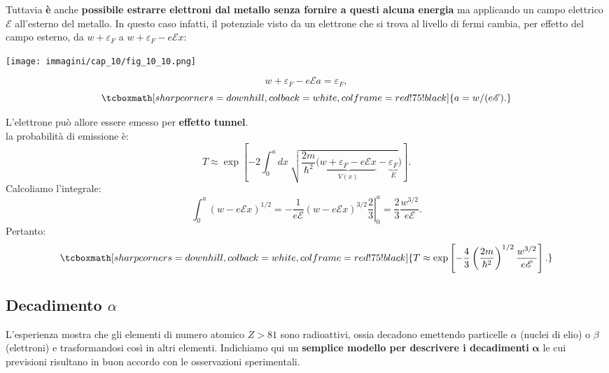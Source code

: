 \documentclass[a4paper,12pt,oneside]{book}
\begin{document}
Tuttavia \textbf{è} anche \textbf{possibile estrarre elettroni dal metallo senza fornire a questi alcuna energia} ma applicando un campo elettrico $\mathscr{E}$ all'esterno del metallo. In questo caso infatti, il potenziale visto da un elettrone che si trova al livello di fermi cambia, per effetto del campo esterno, da $w+\varepsilon _F$ a $w+\varepsilon _F-e\mathscr{E}x$:\\
\vspace{.5cm}
\begin{minipage}{.6\textwidth}
\texttt{[image: immagini/cap\_10/fig\_10\_10.png]}
\end{minipage}
\begin{minipage}{.4\textwidth}
\begin{equation}
w+\varepsilon _F-e\mathscr{E}a=\varepsilon _F ,
\end{equation}
\begin{equation}
\tcboxmath[sharp corners=downhill, colback=white, colframe=red!75!black]{
a= w/(e\mathscr{E}) .
}
\end{equation}
\end{minipage}
L'elettrone può allore essere emesso per \textbf{effetto tunnel}.\\
la probabilità di emissione è:
	\begin{equation}
		T \approx \exp \left[-2 \int_{0} ^{a} dx\ \sqrt{\frac{2m}{\hbar ^2} (\underbrace{w+\varepsilon _F-e\mathscr{E}x}_{V(x)}-\underbrace{\varepsilon _F}_{E}})\right].
	\end{equation}
Calcoliamo l'integrale:
	\begin{equation}
		\int _{0} ^{a} \left( w-e\mathscr{E}x \right) ^{1/2}= \left. -\frac{1}{e\mathscr{E}}\left( w-e\mathscr{E}x \right) ^{3/2}\frac{2}{3}\right| _0 ^a =\frac{2}{3}\frac{w^{3/2}}{e\mathscr{E}}.
	\end{equation}
Pertanto:
	\begin{equation}
		\tcboxmath[sharp corners=downhill, colback=white, colframe=red!75!black]{
		T \approx \exp \left[-\frac{4}{3}\left(\frac{2m}{\hbar ^2}\right)^{1/2}\frac{w^{3/2}}{e\mathscr{E}}\right].
		}
	\end{equation}
\subsection{Decadimento $\alpha$}
L'esperienza mostra che gli elementi di numero atomico $Z>81$ sono radioattivi, ossia decadono emettendo particelle $\alpha$ (nuclei di elio) o $\beta$ (elettroni) e trasformandosi così in altri elementi. Indichiamo qui un \textbf{semplice modello per descrivere i decadimenti} $\mathbf{\alpha}$ le cui previsioni risultano in buon accordo con le osservazioni sperimentali.\\
\end{document}
